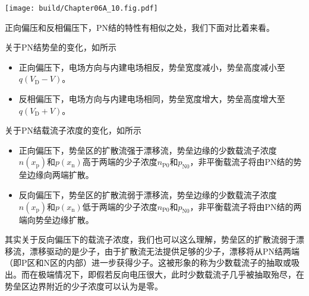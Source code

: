 \begin{Figure}[反向偏压下的能带结构]
    \texttt{[image: build/Chapter06A\_10.fig.pdf]}
\end{Figure}

正向偏压和反相偏压下，PN结的特性有相似之处，我们下面对比着来看。

关于PN结势垒的变化，如所示
\begin{itemize}
    \item 正向偏压下，电场方向与内建电场相反，势垒宽度减小，势垒高度减小至$q(V_\text{D}-V)$。
    \item 反相偏压下，电场方向与内建电场相同，势垒宽度增大，势垒高度增大至$q(V_\text{D}+V)$。
\end{itemize}\goodbreak

关于PN结载流子浓度的变化，如所示
\begin{itemize}
    \item 正向偏压下，势垒区的扩散流强于漂移流，势垒边缘的少数载流子浓度$n(x_\text{p})$和$p(x_\text{n})$高于两端的少子浓度$n_\text{P0}$和$p_\text{N0}$，非平衡载流子将由PN结的势垒边缘向两端扩散。
    \item 反向偏压下，势垒区的扩散流弱于漂移流，势垒边缘的少数载流子浓度$n(x_\text{p})$和$p(x_\text{n})$低于两端的少子浓度$n_\text{P0}$和$p_\text{N0}$，非平衡载流子将由PN结的两端向势垒边缘扩散。
\end{itemize}
其实关于反向偏压下的载流子浓度，我们也可以这么理解，势垒区的扩散流弱于漂移流，漂移驱动的是少子，由于扩散流无法提供足够的少子，漂移将从PN结两端（即P区和N区的内部）进一步获得少子。这被形象的称为少数载流子的抽取或吸出。而在极端情况下，即假若反向电压很大，此时少数载流子几乎被抽取殆尽，在势垒区边界附近的少子浓度可以认为是零。

